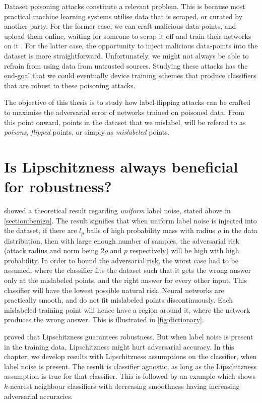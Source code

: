 \documentclass{ociamthesis}
\begin{document}
Dataset poisoning attacks constitute a relevant problem. This is because most
practical machine learning systems utilise data that is scraped, or curated by
another party. For the former case, we can craft malicious data-points, and
upload them online, waiting for someone to scrap it off and train their networks
on it \citep{transferable-clean-label-poisoning}. For the latter case, the
opportunity to inject malicious data-points into the dataset is more
straightforward. Unfortunately, we might not always be able to refrain from
using data from untrusted sources. Studying these attacks has the end-goal that
we could eventually device training schemes that produce classifiers that are
robust to these poisoning attacks.

The objective of this thesis is to study how label-flipping attacks can be
crafted to maximise the adversarial error of networks trained on poisoned data.
From this point onward, points in the dataset that we mislabel, will be refered
to as \emph{poisons}, \emph{flipped} points, or simply as \emph{mislabeled}
points.


\chapter{Is Lipschitzness always beneficial for robustness?}
\label{section:Lipschitzness-assumption}

\citet{sanyal2021how} showed a theoretical result regarding \emph{uniform} label
noise, stated above in \cref{section:benign}. The result signifies that when
uniform label noise is injected into the dataset, if there are $l_p$ balls of
high probability mass with radius $\rho$ in the data distribution, then with
large enough number of samples, the adversarial risk (attack radius and norm
being $2\rho$ and $p$ respectively) will be high with high probability. In order
to bound the adversarial risk, the worst case had to be assumed, where the
classifier fits the dataset such that it gets the wrong answer only at the
mislabeled points, and the right answer for every other input. This classifier
will have the lowest possible natural risk. Neural networks are practically
smooth, and do not fit mislabeled points discontinuously. Each mislabeled
training point will hence have a region around it, where the network produces
the wrong answer. This is illustrated in \cref{fig:dictionary}.

\citet{DBLP:conf/nips/HeinA17} proved that Lipschitzness guarantees robustness.
But when label noise is present in the training data, Lipschitzness might hurt
adversarial accuracy. In this chapter, we develop results with Lipschitzness
assumptions on the classifier, when label noise is present. The result is
classifier agnostic, as long as the Lipschitzness assumption is true for that
classifier. This is followed by an example which shows $k$-nearest neighbour
classifiers with decreasing smoothness having increasing adversarial accuracies.
\end{document}
